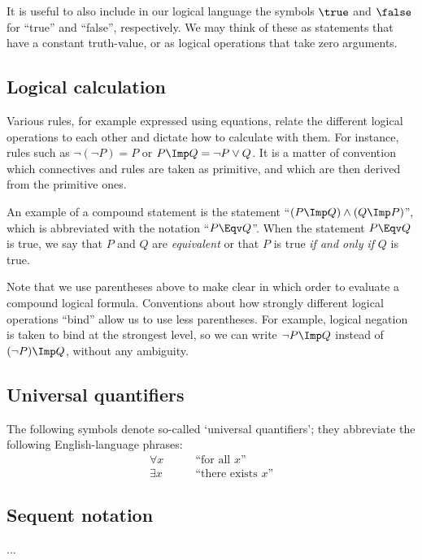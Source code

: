 It is useful to also include in our logical language the symbols $\true$ and $\false$ for ``true'' and ``false'', respectively. We may think of these as statements that have a constant truth-value, or as logical operations that take zero arguments. 


\subsection{Logical calculation}

Various rules, for example expressed using equations, relate the different logical operations to each other and dictate how to calculate with them. For instance, rules such as $\lnot (\lnot P) = P$ or $P \Imp Q = \lnot P \vee Q$. It is a matter of convention which connectives and rules are taken as primitive, and which are then derived from the primitive ones. 

An example of a compound statement is the statement ``$(P \Imp Q) \wedge (Q \Imp P)$'', which is abbreviated with the notation ``$P \Eqv Q$''. When the statement $P \Eqv Q$ is true, we say that $P$ and $Q$ are \emph{equivalent} or that $P$ is true \emph{if and only if} $Q$ is true. 

Note that we use parentheses above to make clear in which order to evaluate a compound logical formula. Conventions about how strongly different logical operations ``bind'' allow us to use less parentheses. For example, logical negation is taken to bind at the strongest level, so we can write $\lnot P \Imp Q$ instead of $(\lnot P) \Imp Q$, without any ambiguity. 





\subsection{Universal quantifiers}

The following symbols denote so-called `universal quantifiers'; they abbreviate the following English-language phrases:
\begin{align}
\forall x &\quad \quad \text{``for all $x$''} \\
\exists x &\quad \quad \text{``there exists $x$''}
\end{align}

\subsection{Sequent notation}


...